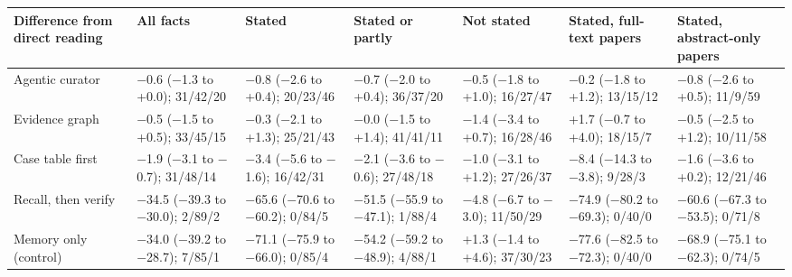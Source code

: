 \documentclass{article} %
\begin{document}
\begin{table}[!htbp]
{\setlength{\tabcolsep}{3pt}%
\begin{tabularx}{\linewidth}{>{\raggedright\arraybackslash}p{2.0cm}>{\centering\arraybackslash}X>{\centering\arraybackslash}X>{\centering\arraybackslash}X>{\centering\arraybackslash}X>{\centering\arraybackslash}X>{\centering\arraybackslash}X}
\toprule
Difference from direct reading & All facts & Stated & Stated or partly & Not stated & Stated, full-text papers & Stated, abstract-only papers \\
\midrule
Agentic curator & $-$0.6 ($-$1.3 to +0.0); 31/42/20 & $-$0.8 ($-$2.6 to +0.4); 20/23/46 & $-$0.7 ($-$2.0 to +0.4); 36/37/20 & $-$0.5 ($-$1.8 to +1.0); 16/27/47 & $-$0.2 ($-$1.8 to +1.2); 13/15/12 & $-$0.8 ($-$2.6 to +0.5); 11/9/59 \\
Evidence graph & $-$0.5 ($-$1.5 to +0.5); 33/45/15 & $-$0.3 ($-$2.1 to +1.3); 25/21/43 & $-$0.0 ($-$1.5 to +1.4); 41/41/11 & $-$1.4 ($-$3.4 to +0.7); 16/28/46 & +1.7 ($-$0.7 to +4.0); 18/15/7 & $-$0.5 ($-$2.5 to +1.2); 10/11/58 \\
Case table first & $-$1.9 ($-$3.1 to $-$0.7); 31/48/14 & $-$3.4 ($-$5.6 to $-$1.6); 16/42/31 & $-$2.1 ($-$3.6 to $-$0.6); 27/48/18 & $-$1.0 ($-$3.1 to +1.2); 27/26/37 & $-$8.4 ($-$14.3 to $-$3.8); 9/28/3 & $-$1.6 ($-$3.6 to +0.2); 12/21/46 \\
Recall, then verify & $-$34.5 ($-$39.3 to $-$30.0); 2/89/2 & $-$65.6 ($-$70.6 to $-$60.2); 0/84/5 & $-$51.5 ($-$55.9 to $-$47.1); 1/88/4 & $-$4.8 ($-$6.7 to $-$3.0); 11/50/29 & $-$74.9 ($-$80.2 to $-$69.3); 0/40/0 & $-$60.6 ($-$67.3 to $-$53.5); 0/71/8 \\
Memory only (control) & $-$34.0 ($-$39.2 to $-$28.7); 7/85/1 & $-$71.1 ($-$75.9 to $-$66.0); 0/85/4 & $-$54.2 ($-$59.2 to $-$48.9); 4/88/1 & +1.3 ($-$1.4 to +4.6); 37/30/23 & $-$77.6 ($-$82.5 to $-$72.3); 0/40/0 & $-$68.9 ($-$75.1 to $-$62.3); 0/74/5 \\
\bottomrule
\end{tabularx}}
\end{table}

\FloatBarrier
\end{document}
